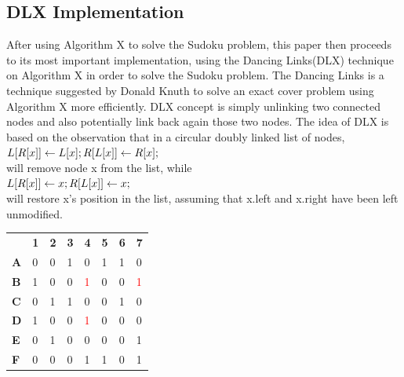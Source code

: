 \documentclass[a4paper,oneside,11pt]{report}
\begin{document}
\subsection{DLX Implementation}
After using Algorithm X to solve the Sudoku problem, this paper then proceeds to its most important implementation, using the Dancing Links(DLX) technique on Algorithm X in order to solve the Sudoku problem. The Dancing Links is a technique suggested by Donald Knuth to solve an exact cover problem using Algorithm X more efficiently. DLX concept is simply unlinking two connected nodes and also potentially link back again those two nodes. The idea of DLX is based on the observation that in a circular doubly linked list of nodes,\\
$L[R[x]] \leftarrow L[x];\\
R[L[x]] \leftarrow R[x];$\\
will remove node x from the list, while\\
$L[R[x]] \leftarrow x;\\
R[L[x]] \leftarrow x;$\\
will restore x’s position in the list, assuming that x.left and x.right have been left unmodified.
\begin{center}
\begin{tabular}{ m{0.5cm}  m{0.5cm} m{0.5cm} m{0.5cm} m{0.5cm} m{0.5cm} m{0.5cm} m{0.5cm}} 
& \textbf{1} & \textbf{2} & \textbf{3} & \textbf{4} & \textbf{5} & \textbf{6} & \textbf{7}\\ 
\textbf{A} & 0 & 0 & 1 & 0 & 1 & 1 & 0\\ 
\textbf{B} & 1 & 0 & 0 & \textcolor{red}{1} & 0 & 0 & \textcolor{red}{1}\\ 
\textbf{C} & 0 & 1 & 1 & 0 & 0 & 1 & 0\\
\textbf{D} & 1 & 0 & 0 & \textcolor{red}{1} & 0 & 0 & 0\\
\textbf{E} & 0 & 1 & 0 & 0 & 0 & 0 & 1\\
\textbf{F} & 0 & 0 & 0 & 1 & 1 & 0 & 1\\
\end{tabular}
\end{center}
\end{document}
